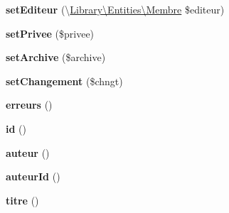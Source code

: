 \begin{DoxyCompactItemize}
\item 
\hypertarget{class_library_1_1_entities_1_1_news_a30eb9f2c1631e9c510340c89eb60a1c9}{{\bfseries set\+Editeur} (\textbackslash{}\hyperlink{class_library_1_1_entities_1_1_membre}{Library\textbackslash{}\+Entities\textbackslash{}\+Membre} \$editeur)}\label{class_library_1_1_entities_1_1_news_a30eb9f2c1631e9c510340c89eb60a1c9}

\item 
\hypertarget{class_library_1_1_entities_1_1_news_a5b70de2b3848dfd5c64183beeafaaafd}{{\bfseries set\+Privee} (\$privee)}\label{class_library_1_1_entities_1_1_news_a5b70de2b3848dfd5c64183beeafaaafd}

\item 
\hypertarget{class_library_1_1_entities_1_1_news_a74c41d5fb2d93a3f2febcb8bcf8d5173}{{\bfseries set\+Archive} (\$archive)}\label{class_library_1_1_entities_1_1_news_a74c41d5fb2d93a3f2febcb8bcf8d5173}

\item 
\hypertarget{class_library_1_1_entities_1_1_news_a50929db36c43a738a69646d16b4b3a06}{{\bfseries set\+Changement} (\$chngt)}\label{class_library_1_1_entities_1_1_news_a50929db36c43a738a69646d16b4b3a06}

\item 
\hypertarget{class_library_1_1_entities_1_1_news_afa6e81c26f240d44bb65d8483b49be53}{{\bfseries erreurs} ()}\label{class_library_1_1_entities_1_1_news_afa6e81c26f240d44bb65d8483b49be53}

\item 
\hypertarget{class_library_1_1_entities_1_1_news_a087060b582403885d08e89ad894ecc5d}{{\bfseries id} ()}\label{class_library_1_1_entities_1_1_news_a087060b582403885d08e89ad894ecc5d}

\item 
\hypertarget{class_library_1_1_entities_1_1_news_af92ffc66818a0b5493246aa8284ee4de}{{\bfseries auteur} ()}\label{class_library_1_1_entities_1_1_news_af92ffc66818a0b5493246aa8284ee4de}

\item 
\hypertarget{class_library_1_1_entities_1_1_news_a52c1c4a3c5950da5a83021ec8d327fca}{{\bfseries auteur\+Id} ()}\label{class_library_1_1_entities_1_1_news_a52c1c4a3c5950da5a83021ec8d327fca}

\item 
\hypertarget{class_library_1_1_entities_1_1_news_a3212da9ec8c8526bebc42a75d3afaf34}{{\bfseries titre} ()}\label{class_library_1_1_entities_1_1_news_a3212da9ec8c8526bebc42a75d3afaf34}


\end{DoxyCompactItemize}
